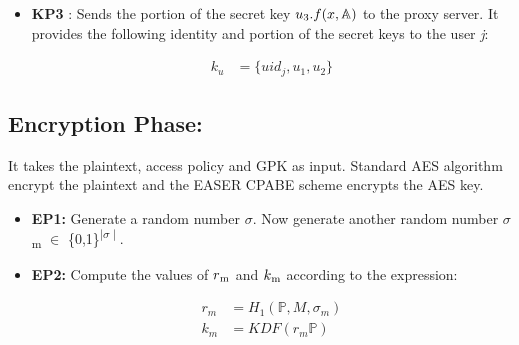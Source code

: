 \documentclass[conference]{IEEEtran}
\begin{document}
{\begin{itemize}
          Send the portion of the keys $u\textsubscript{1}$ and $u\textsubscript{2}$ to the user and $u\textsubscript{3}$ to the proxy server.

    \item{\textbf {KP3}} : Sends the portion of the secret key $u\textsubscript{3} .  f(x, \mathbb{A} )$ to the proxy server.
          It provides the following identity and portion of the secret keys to the user \emph{j}:

          \begin{ceqn}
              \begin{align}
                  k_u & = \{uid_j, u_1, u_2\}
              \end{align}
          \end{ceqn}

\end{itemize}


\subsection{\textbf {Encryption Phase: }}
It takes the plaintext, access policy and GPK as input. Standard AES algorithm encrypt the plaintext and the EASER CPABE scheme encrypts the AES key.

\begin{itemize}

    \item{\textbf {EP1:}} Generate a random number $\sigma$. Now generate another random number $\sigma$\textsubscript{m} $\in$ \{0,1\}\textsuperscript{$\mid\sigma\mid$}.

          {\color{red}{What is the difference between the two?}}

    \item{\textbf{EP2:}} Compute the values of $r\textsubscript{m}$ and $k\textsubscript{m}$ according to the expression:
          \begin{ceqn}
              \begin{align}
                  r_m & = H_1(\mathbb{P}, M, \sigma_m ) \\
                  k_m & = KDF(r_m\mathbb{P} )
              \end{align}
          \end{ceqn}


\end{itemize}}
\end{document}
